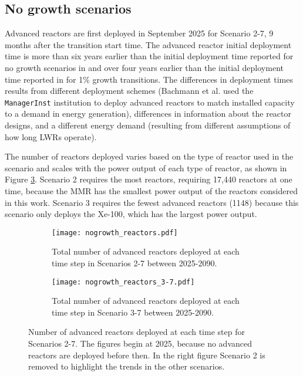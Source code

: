 \subsection{No growth scenarios} \label{sec:nogrowth_reactors}
Advanced reactors are first deployed in September 2025 for Scenario 2-7, 
9 months after the transition start time. The advanced reactor initial 
deployment time is more than six years earlier than the initial deployment 
time reported for no growth scenarios in 
\cite{bachmann_enrichment_2021} and over four years earlier than the 
initial deployment time reported in \cite{bachmann_enrichment_2021}
for 1\% growth transitions. The differences in deployment times results 
from different deployment schemes (Bachmann et al. used the \Cycamore 
\texttt{ManagerInst} institution to deploy advanced reactors to match installed 
capacity to a demand in energy generation), differences 
in information about the reactor designs, and a different energy demand 
(resulting from different assumptions of how long \glspl{LWR} operate). 

The number of reactors deployed varies based on 
the type of reactor used in the scenario and scales with the power output of 
each type of reactor, as shown in Figure \ref{fig:nogrowth_reactors}. Scenario
2 requires the most reactors, requiring 17,440 reactors at one time, 
because the \gls{MMR} has the smallest power output of the reactors 
considered in this work. Scenario 3 requires the fewest 
advanced reactors (1148) because this scenario only deploys the Xe-100,
which has the largest power output. 

\begin{figure}
    \centering
    \begin{subfigure}[b]{0.45\textwidth}
        \centering
        \texttt{[image: nogrowth\_reactors.pdf]}
        \caption{Total number of advanced reactors deployed at 
        each time step in Scenarios 2-7 between 2025-2090.}
        \label{fig:nogrowth_reactors_all}
    \end{subfigure}
    \hfill
    \begin{subfigure}[b]{0.45\textwidth}
        \centering
        \texttt{[image: nogrowth\_reactors\_3-7.pdf]}
        \caption{Total number of advanced reactors deployed at 
        each time step in Scenario 3-7 between 2025-2090.}
        \label{fig:nogrowth_reactors_3-7}
    \end{subfigure}
       \caption{Number of advanced reactors deployed at each time step 
       for Scenarios 2-7. The figures begin at 2025, because no advanced 
       reactors are deployed before then. In the right figure Scenario 
       2 is removed to highlight the trends in the other scenarios.}
       \label{fig:nogrowth_reactors}
\end{figure}

